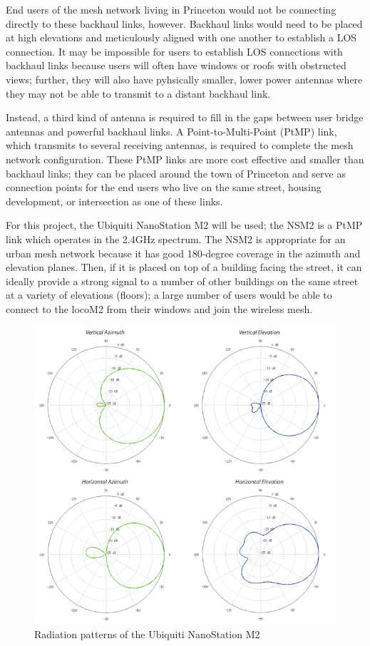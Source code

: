 \documentclass[pageno]{jpaper}
\begin{document}
End users of the mesh network living in Princeton would not be connecting directly to these backhaul links, however. Backhaul links would need to be placed at high elevations and meticulously aligned with one another to establish a LOS connection. It may be impossible for users to establish LOS connections with backhaul links because users will often have windows or roofs with obstructed views; further, they will also have pyhsically smaller, lower power antennas where they may not be able to transmit to a distant backhaul link.

Instead, a third kind of antenna is required to fill in the gaps between user bridge antennas and powerful backhaul links. A Point-to-Multi-Point (PtMP) link, which transmits to several receiving antennas, is required to complete the mesh network configuration. These PtMP links are more cost effective and smaller than backhaul links; they can be placed around the town of Princeton and serve as connection points for the end users who live on the same street, housing development, or intersection as one of these links.

For this project, the Ubiquiti NanoStation M2 will be used; the NSM2 is a PtMP link which operates in the 2.4GHz spectrum. The NSM2 is appropriate for an urban mesh network because it has good 180-degree coverage in the azimuth and elevation planes. Then, if it is placed on top of a building facing the street, it can ideally provide a strong signal to a number of other buildings on the same street at a variety of elevations (floors); a large number of users would be able to connect to the locoM2 from their windows and join the wireless mesh.

\begin{figure}[h]
	\caption{Radiation patterns of the Ubiquiti NanoStation M2}
	\includegraphics{nsm2_radiation}
	\centering
\end{figure}
\end{document}
